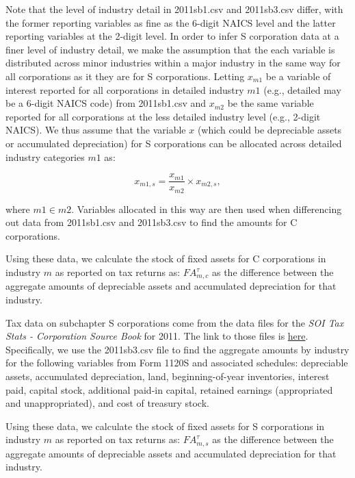 \documentclass[article,11pt,letterpaper,fleqn]{article}
\theoremstyle{definition}
\numberwithin{equation}{section}
\begin{document}
Note that the level of industry detail in 2011sb1.csv and 2011sb3.csv differ, with the former reporting variables as fine as the 6-digit NAICS level and the latter reporting variables at the 2-digit level.  In order to infer S corporation data at a finer level of industry detail, we make the assumption that the each variable is distributed across minor industries within a major industry in the same way for all corporations as it they are for S corporations.  Letting $x_{m1}$ be a variable of interest reported for all corporations in detailed industry $m1$ (e.g., detailed may be a 6-digit NAICS code) from 2011sb1.csv and $x_{m2}$ be the same variable reported for all corporations at the less detailed industry level (e.g., 2-digit NAICS).  We thus assume that the variable $x$ (which could be depreciable assets or accumulated depreciation) for S corporations can be allocated across detailed industry categories $m1$ as:

\begin{equation}
x_{m1,s}=\frac{x_{m1}}{x_{m2}}\times x_{m2,s},
\end{equation}

\noindent\noindent where $m1\in m2$.  Variables allocated in this way are then used when differencing out data from 2011sb1.csv and 2011sb3.csv to find the amounts for C corporations.

Using these data, we calculate the stock of fixed assets for C corporations in industry $m$ as reported on tax returns as: ${FA}^{\tau}_{m,c}$ as the difference between the aggregate amounts of depreciable assets and accumulated depreciation for that industry.  

Tax data on subchapter S corporations come from the data files for the \emph{SOI Tax Stats - Corporation Source Book} for 2011.  The link to those files is \href{http://www.irs.gov/uac/SOI-Tax-Stats-Corporation-Source-Book:-Data-File}{here}.  Specifically, we use the 2011sb3.csv file to find the aggregate amounts by industry for the following variables from Form 1120S and associated schedules: depreciable assets, accumulated depreciation, land, beginning-of-year inventories, interest paid, capital stock, additional paid-in capital, retained earnings (appropriated and unappropriated), and cost of treasury stock.  

Using these data, we calculate the stock of fixed assets for S corporations in industry $m$ as reported on tax returns as: ${FA}^{\tau}_{m,s}$ as the difference between the aggregate amounts of depreciable assets and accumulated depreciation for that industry. 
\end{document}
